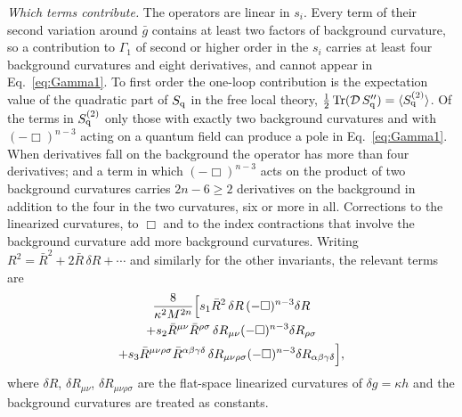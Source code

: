 \documentclass[a4paper,11pt]{article}
\newcommand{\Tr}{\operatorname{Tr}}
\begin{document}
\textit{Which terms contribute.} The operators are linear in $s_i$. Every term of their second variation around $\bar g$ contains at least two factors of background curvature, so a contribution to $\Gamma_1$ of second or higher order in the $s_i$ carries at least four background curvatures and eight derivatives, and cannot appear in Eq.~\eqref{eq:Gamma1}. To first order the one-loop contribution is the expectation value of the quadratic part of $S_{\rm q}$ in the free local theory, $\frac12\Tr(\mathcal D\,S''_{\rm q})=\langle S^{(2)}_{\rm q}\rangle$. Of the terms in $S^{(2)}_{\rm q}$ only those with exactly two background curvatures and with $(-\Box)^{n-3}$ acting on a quantum field can produce a pole in Eq.~\eqref{eq:Gamma1}. When derivatives fall on the background the operator has more than four derivatives; and a term in which $(-\Box)^{n-3}$ acts on the product of two background curvatures carries $2n-6\ge2$ derivatives on the background in addition to the four in the two curvatures, six or more in all. Corrections to the linearized curvatures, to $\Box$ and to the index contractions that involve the background curvature add more background curvatures. Writing $R^2=\bar R^2+2\bar R\,\delta R+\cdots$ and similarly for the other invariants, the relevant terms are
\begin{multline}
\label{eq:Sq2}
\frac{8}{\kappa^2M^{2n}}\Bigl[s_1\bar R^2\,\delta R\,(-\Box)^{n-3}\delta R\\
+s_2\bar R^{\mu\nu}\bar R^{\rho\sigma}\,\delta R_{\mu\nu}(-\Box)^{n-3}\delta R_{\rho\sigma}\\
+s_3\bar R^{\mu\nu\rho\sigma}\bar R^{\alpha\beta\gamma\delta}\,\delta R_{\mu\nu\rho\sigma}(-\Box)^{n-3}\delta R_{\alpha\beta\gamma\delta}\Bigr],
\end{multline}
where $\delta R$, $\delta R_{\mu\nu}$, $\delta R_{\mu\nu\rho\sigma}$ are the flat-space linearized curvatures of $\delta g=\kappa h$ and the background curvatures are treated as constants.
\end{document}

